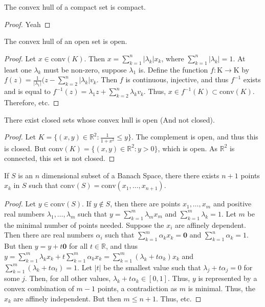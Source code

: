 \documentclass[crop=false,class=article,oneside]{standalone}
\begin{document}
        \begin{theorem}
        The convex hull of a compact set is compact.
        \end{theorem}
        \begin{proof}
        Yeah
        \end{proof}
        \begin{theorem}
        The convex hull of an open set is open.
        \end{theorem}
        \begin{proof}
        Let $x\in \textrm{conv}(K)$. Then $x=\sum_{k=1}^{n}|\lambda_k| x_k$, where $\sum_{k=1}^{n}|\lambda_k| = 1$. At least one $\lambda_k$ must be non-zero, suppose $\lambda_1$ is. Define the function $f:\textrm{K}\rightarrow \textrm{K}$ by $f(z) = \frac{1}{|\lambda_1|}(z-\sum_{k=2}^{n}|\lambda_k|v_k$. Then $f$ is continuous, injective, and thus $f^{-1}$ exists and is equal to $f^{-1}(z) = \lambda_1 z +\sum_{k=2}^{n}\lambda_k v_k$. Thus, $x\in f^{-1}(K)\subset\textrm{conv}(K)$. Therefore, etc. 
        \end{proof}
        \begin{theorem}
        There exist closed sets whose convex hull is open (And not closed).
        \end{theorem}
        \begin{proof}
        Let $K = \{(x,y)\in \mathbb{R}^2:\frac{1}{1+x^2}\leq y\}$. The complement is open, and thus this is closed. But $\textrm{conv}(K) = \{(x,y)\in \mathbb{R}^2:y>0\}$, which is open. As $\mathbb{R}^2$ is connected, this set is not closed.
        \end{proof}
        \begin{theorem}
        If $S$ is an $n$ dimensional subset of a Banach Space, there there exists $n+1$ points $x_k$ in $S$ such that $\textrm{conv}(S) = \textrm{conv}(x_1,\hdots, x_{n+1})$.
        \end{theorem}
        \begin{proof}
        Let $y\in \textrm{conv}(S)$. If $y\notin S$, then there are points $x_1,\hdots, x_m$ and positive real numbers $\lambda_1,\hdots, \lambda_m$ such that $y=\sum_{k=1}^{m}\lambda_m x_m$ and $\sum_{k=1}^{m}\lambda_k = 1$. Let $m$ be the minimal number of points needed. Suppose the $x_i$ are affinely dependent. Then there are real numbers $\alpha_i$ such that $\sum_{k=1}^{m}\alpha_k x_k = \mathbf{0}$ and $\sum_{k=1}^{n}\alpha_k =1$. But then $y = y+t\mathbf{0}$ for all $t\in \mathbb{R}$, and thus $y = \sum_{k=1}^{m}\lambda_k x_k + t\sum_{k=1}^{m}\alpha_k x_k = \sum_{k=1}^{m}(\lambda_k + t\alpha_k)x_k$ and $\sum_{k=1}^{m}(\lambda_k+t\alpha_t) = 1$. Let $|t|$ be the smallest value such that $\lambda_j + t\alpha_j = 0$ for some $j$. Then, for all other values, $\lambda_k + t\alpha_k \in [0,1]$. Thus, $y$ is represented by a convex combination of $m-1$ points, a contradiction as $m$ is minimal. Thus, the $x_k$ are affinely independent. But then $m \leq n+1$. Thus, etc.
        \end{proof}
\end{document}
